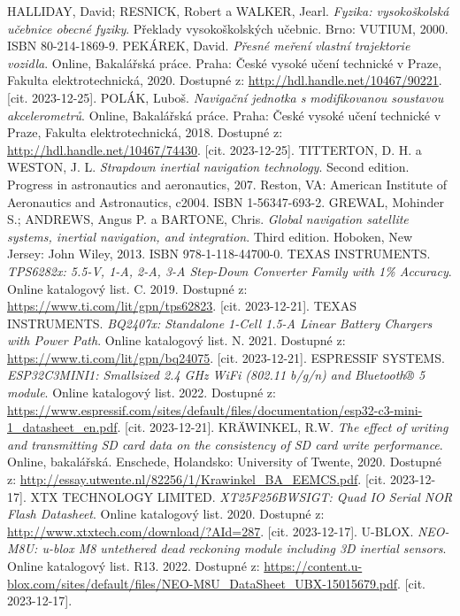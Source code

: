\begin{thebibliography}{29}
HALLIDAY, David; RESNICK, Robert a WALKER, Jearl. \textit{Fyzika: vysokoškolská učebnice obecné fyziky}. Překlady vysokoškolských učebnic. Brno: VUTIUM, 2000. ISBN 80-214-1869-9.
PEKÁREK, David. \textit{Přesné meření vlastní trajektorie vozidla}. Online, Bakalářská práce. Praha: České vysoké učení technické v Praze, Fakulta elektrotechnická, 2020. Dostupné z: \url{http://hdl.handle.net/10467/90221}. [cit. 2023-12-25].
POLÁK, Luboš. \textit{Navigační jednotka s modifikovanou soustavou akcelerometrů}. Online, Bakalářská práce. Praha: České vysoké učení technické v Praze, Fakulta elektrotechnická, 2018. Dostupné z: \url{http://hdl.handle.net/10467/74430}. [cit. 2023-12-25].
TITTERTON, D. H. a WESTON, J. L. \textit{Strapdown inertial navigation technology}. Second edition. Progress in astronautics and aeronautics, 207. Reston, VA: American Institute of Aeronautics and Astronautics, c2004. ISBN 1-56347-693-2.
GREWAL, Mohinder S.; ANDREWS, Angus P. a BARTONE, Chris. \textit{Global navigation satellite systems, inertial navigation, and integration}. Third edition. Hoboken, New Jersey: John Wiley, 2013. ISBN 978-1-118-44700-0.
TEXAS INSTRUMENTS. \textit{TPS6282x: 5.5-V, 1-A, 2-A, 3-A Step-Down Converter Family with 1\% Accuracy}. Online katalogový list. C. 2019. Dostupné z: \url{https://www.ti.com/lit/gpn/tps62823}. [cit. 2023-12-21].
TEXAS INSTRUMENTS. \textit{BQ2407x: Standalone 1-Cell 1.5-A Linear Battery Chargers with Power Path}. Online katalogový list. N. 2021. Dostupné z: \url{https://www.ti.com/lit/gpn/bq24075}. [cit. 2023-12-21].
ESPRESSIF SYSTEMS. \textit{ESP32C3MINI1: Smallsized 2.4 GHz WiFi (802.11 b/g/n) and Bluetooth® 5 module}. Online katalogový list. 2022. Dostupné z: \url{https://www.espressif.com/sites/default/files/documentation/esp32-c3-mini-1\_datasheet\_en.pdf}. [cit. 2023-12-21].
KRÄWINKEL, R.W. \textit{The effect of writing and transmitting SD card data on the consistency of SD card write performance}. Online, bakalářská. Enschede, Holandsko: University of Twente, 2020. Dostupné z: \url{http://essay.utwente.nl/82256/1/Krawinkel\_BA\_EEMCS.pdf}. [cit. 2023-12-17].
XTX TECHNOLOGY LIMITED. \textit{XT25F256BWSIGT: Quad IO Serial NOR Flash Datasheet}. Online katalogový list. 2020. Dostupné z: \url{http://www.xtxtech.com/download/?AId=287}. [cit. 2023-12-17].
U-BLOX. \textit{NEO-M8U: u-blox M8 untethered dead reckoning module including 3D inertial sensors}. Online katalogový list. R13. 2022. Dostupné z: \url{https://content.u-blox.com/sites/default/files/NEO-M8U\_DataSheet\_UBX-15015679.pdf}. [cit. 2023-12-17].

\end{thebibliography}
